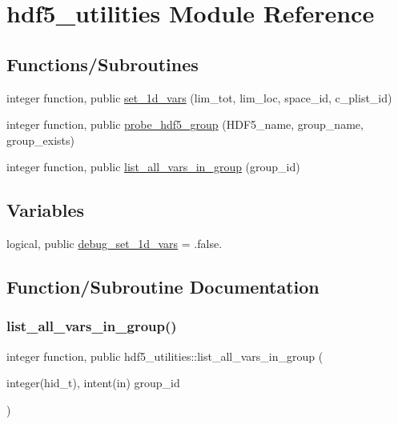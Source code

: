 \hypertarget{namespacehdf5__utilities}{}\section{hdf5\+\_\+utilities Module Reference}
\label{namespacehdf5__utilities}
\subsection*{Functions/\+Subroutines}
\begin{DoxyCompactItemize}
\item 
integer function, public \hyperlink{namespacehdf5__utilities_a7574320980affc30a584f7776d33a51c}{set\+\_\+1d\+\_\+vars} (lim\+\_\+tot, lim\+\_\+loc, space\+\_\+id, c\+\_\+plist\+\_\+id)
\item 
integer function, public \hyperlink{namespacehdf5__utilities_ae4e6c96512460a0ede8dc5b1a43681e8}{probe\+\_\+hdf5\+\_\+group} (H\+D\+F5\+\_\+name, group\+\_\+name, group\+\_\+exists)
\item 
integer function, public \hyperlink{namespacehdf5__utilities_aa9d76166f970a7052cd0d96c8f3ee0be}{list\+\_\+all\+\_\+vars\+\_\+in\+\_\+group} (group\+\_\+id)
\end{DoxyCompactItemize}
\subsection*{Variables}
\begin{DoxyCompactItemize}
\item 
logical, public \hyperlink{namespacehdf5__utilities_addf084b90450dc2a0cc614f2f5ac13fc}{debug\+\_\+set\+\_\+1d\+\_\+vars} = .false.
\end{DoxyCompactItemize}


\subsection{Function/\+Subroutine Documentation}
\mbox{\label{namespacehdf5__utilities_aa9d76166f970a7052cd0d96c8f3ee0be}} 
\subsubsection{\texorpdfstring{list\+\_\+all\+\_\+vars\+\_\+in\+\_\+group()}{list\_all\_vars\_in\_group()}}
{\footnotesize\ttfamily integer function, public hdf5\+\_\+utilities\+::list\+\_\+all\+\_\+vars\+\_\+in\+\_\+group (\begin{DoxyParamCaption}\item[{integer(hid\+\_\+t), intent(in)}]{group\+\_\+id }\end{DoxyParamCaption})}



